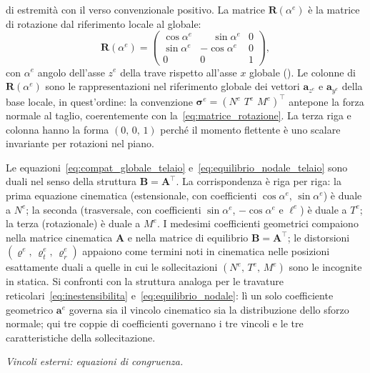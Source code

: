 di estremità con il verso convenzionale positivo.
La matrice $\bm{R}(\alpha^e)$ è la matrice di
rotazione dal riferimento locale al globale:
\begin{equation}\label{eq:matrice_rotazione}
	\bm{R}(\alpha^e) =
	\begin{pmatrix}
		\cos\alpha^e & \phantom{-}\sin\alpha^e & 0 \\
		\sin\alpha^e & -\cos\alpha^e & 0 \\
		0 & 0 & 1
	\end{pmatrix},
\end{equation}
con $\alpha^e$ angolo dell'asse $z^e$ della trave
rispetto all'asse $x$ globale
().
Le colonne di $\bm{R}(\alpha^e)$ sono le rappresentazioni
nel riferimento globale dei vettori $\mathbf{a}_{z^e}$ e
$\mathbf{a}_{y^e}$ della base locale, in quest'ordine:
la convenzione $\bm{\sigma}^e = (N^e\,\,T^e\,\,M^e)^\top$
antepone la forza normale al taglio, coerentemente
con la~\eqref{eq:matrice_rotazione}.
La terza riga e colonna hanno la forma $(0,\,0,\,1)$
perché il momento flettente è uno scalare invariante per
rotazioni nel piano.

\begin{oss}[Dualità cinematica--statica:
	$\bm{B} = \bm{A}^\top$]
	Le equazioni~\eqref{eq:compat_globale_telaio}
	e~\eqref{eq:equilibrio_nodale_telaio} sono duali
	nel senso della struttura $\bm{B} = \bm{A}^\top$.
	La corrispondenza è riga per riga:
	la prima equazione cinematica (estensionale,
	con coefficienti $\cos\alpha^e$, $\sin\alpha^e$)
	è duale a $N^e$;
	la seconda (trasversale, con coefficienti
	$\sin\alpha^e$, $-\cos\alpha^e$ e $\ell^e$)
	è duale a $T^e$;
	la terza (rotazionale) è duale a $M^e$.
	I medesimi coefficienti geometrici compaiono
	nella matrice cinematica $\bm{A}$ e nella matrice
	di equilibrio $\bm{B} = \bm{A}^\top$; le distorsioni
	$(\varrho^e,\, \varrho^e_t,\, \varrho^e_r)$ appaiono
	come termini noti in cinematica nelle posizioni
	esattamente duali a quelle in cui le sollecitazioni
	$(N^e,\, T^e,\, M^e)$ sono le incognite in statica.
	Si confronti con la struttura analoga per le
	travature reticolari~\eqref{eq:inestensibilita}
	e~\eqref{eq:equilibrio_nodale}: lì un solo
	coefficiente geometrico $\bm{a}^e$ governa
	sia il vincolo cinematico sia la distribuzione
	dello sforzo normale; qui tre coppie di
	coefficienti governano i tre vincoli e le
	tre caratteristiche della sollecitazione.
\end{oss}

\medskip
\noindent\textit{Vincoli esterni: equazioni di congruenza.}
\label{subsec:telai_vincoli_esterni}

